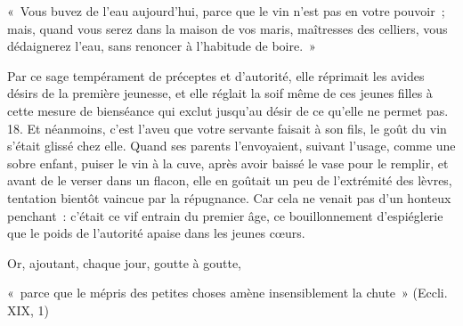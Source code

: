 \documentclass[french,twoside]{book} %
\newenvironment{quoteblock}%
  {\begin{quoting}}
  {\end{quoting}}
\newenvironment{quotebar}{%
    \def\FrameCommand{{\color{rubric!10!}\vrule width 0.5em} \hspace{0.9em}}%
    \def\OuterFrameSep{\itemsep} %
    \MakeFramed {\advance\hsize-\width \FrameRestore}
  }%
  {%
    \endMakeFramed
  }
\renewenvironment{quoteblock}%
  {%
    \savenotes
    \setstretch{0.9}
    \normalfont
    \begin{quotebar}
  }
  {%
    \end{quotebar}
    \spewnotes
  }
\begin{document}
\begin{quoteblock}
\noindent « Vous buvez de l’eau aujourd’hui, parce que le vin n’est pas en votre pouvoir ; mais, quand vous serez dans la maison de vos maris, maîtresses des celliers, vous dédaignerez l’eau, sans renoncer à l’habitude de boire. »\end{quoteblock}

 \noindent Par ce sage tempérament de préceptes et d’autorité, elle réprimait les avides désirs de la première jeunesse, et elle réglait la soif même de ces jeunes filles à cette mesure de bienséance qui exclut jusqu’au désir de ce qu’elle ne permet pas. 18. Et néanmoins, c’est l’aveu que votre servante faisait à son fils, le goût du vin s’était glissé chez elle. Quand ses parents l’envoyaient, suivant l’usage, comme une sobre enfant, puiser le vin à la cuve, après avoir baissé le vase pour le remplir, et avant de le verser dans un flacon, elle en goûtait un peu de l’extrémité des lèvres, tentation bientôt vaincue par la répugnance. Car cela ne venait pas d’un honteux penchant : c’était ce vif entrain du premier âge, ce bouillonnement d’espiéglerie que le poids de l’autorité apaise dans les jeunes cœurs.\par
Or, ajoutant, chaque jour, goutte à goutte,\par

\begin{quoteblock}
\noindent « parce que le mépris des petites choses amène insensiblement la chute » (Eccli. XIX, 1)\end{quoteblock}
\end{document}
